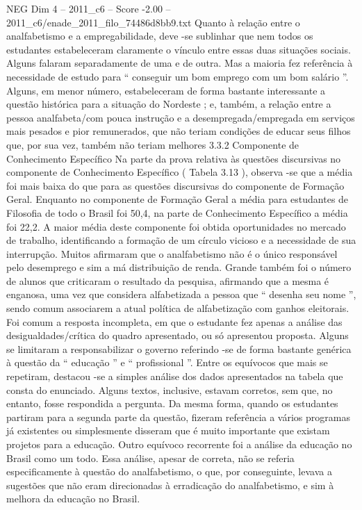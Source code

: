 \begin{textsample}{NEG Dim 4 – 2011\_c6 – Score -2.00 – 2011\_c6/enade\_2011\_filo\_74486d8bb9.txt}
Quanto à relação entre o analfabetismo e a empregabilidade, deve -se sublinhar que nem todos os estudantes estabeleceram claramente o vínculo entre essas duas situações sociais.
Alguns falaram separadamente de uma e de outra.
Mas a maioria fez referência à necessidade de estudo para “ conseguir um bom emprego com um bom salário ”.
Alguns, em menor número, estabeleceram de forma bastante interessante a questão histórica para a situação do Nordeste ; e, também, a relação entre a pessoa analfabeta/com pouca instrução e a desempregada/empregada em serviços mais pesados e pior remunerados, que não teriam condições de educar seus filhos que, por sua vez, também não teriam melhores 3.3.2 Componente de Conhecimento Específico Na parte da prova relativa às questões discursivas no componente de Conhecimento Específico ( Tabela 3.13 ), observa -se que a média foi mais baixa do que para as questões discursivas do componente de Formação Geral.
Enquanto no componente de Formação Geral a média para estudantes de Filosofia de todo o Brasil foi 50,4, na parte de Conhecimento Específico a média foi 22,2.
A maior média deste componente foi obtida oportunidades no mercado de trabalho, identificando a formação de um círculo vicioso e a necessidade de sua interrupção.
Muitos afirmaram que o analfabetismo não é o único responsável pelo desemprego e sim a má distribuição de renda.
Grande também foi o número de alunos que criticaram o resultado da pesquisa, afirmando que a mesma é enganosa, uma vez que considera alfabetizada a pessoa que “ desenha seu nome ”, sendo comum associarem a atual política de alfabetização com ganhos eleitorais.
Foi comum a resposta incompleta, em que o estudante fez apenas a análise das desigualdades/crítica do quadro apresentado, ou só apresentou proposta.
Alguns se limitaram a responsabilizar o governo referindo -se de forma bastante genérica à questão da “ educação ” e “ profissional ”.
Entre os equívocos que mais se repetiram, destacou -se a simples análise dos dados apresentados na tabela que consta do enunciado.
Alguns textos, inclusive, estavam corretos, sem que, no entanto, fosse respondida a pergunta.
Da mesma forma, quando os estudantes partiram para a segunda parte da questão, fizeram referência a vários programas já existentes ou simplesmente disseram que é muito importante que existam projetos para a educação.
Outro equívoco recorrente foi a análise da educação no Brasil como um todo.
Essa análise, apesar de correta, não se referia especificamente à questão do analfabetismo, o que, por conseguinte, levava a sugestões que não eram direcionadas à erradicação do analfabetismo, e sim à melhora da educação no Brasil.

\end{textsample}
